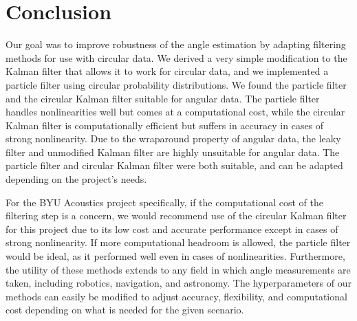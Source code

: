 \documentclass[11pt]{amsart}
\begin{document}
\section{Conclusion}
Our goal was to improve robustness of the angle estimation by adapting filtering methods for use with circular data. We derived a very simple modification to the Kalman filter that 
allows it to work for circular data, and we implemented a particle filter using circular probability distributions. We found the particle filter and the circular Kalman filter suitable 
for angular data. The particle filter handles nonlinearities well but comes at a computational cost, while the circular Kalman filter is computationally efficient but suffers in 
accuracy in cases of strong nonlinearity. Due to the wraparound property of angular data, the leaky filter and unmodified Kalman filter are highly unsuitable for angular data. The particle 
filter and circular Kalman filter were both suitable, and can be adapted depending on the project’s needs.

For the BYU Acoustics project specifically, if the computational cost of the filtering step is a concern, we would recommend use of the circular Kalman filter for this project due to its low 
cost and accurate performance except in cases of strong nonlinearity. If more computational headroom is allowed, the particle filter would be ideal, as it performed well even in cases of 
nonlinearities. Furthermore, the utility of these methods extends to any field in which angle measurements are taken, including robotics, navigation, and astronomy. The hyperparameters of our 
methods can easily be modified to adjust accuracy, flexibility, and computational cost depending on what is needed for the given scenario. 




\FloatBarrier %
\newpage

\end{document}
